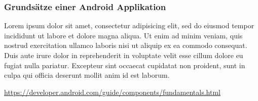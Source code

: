 \subsubsection{Grundsätze einer Android Applikation}
\label{subsec:aapp-fundam}

Lorem ipsum dolor sit amet, consectetur adipisicing elit, sed do eiusmod
tempor incididunt ut labore et dolore magna aliqua. Ut enim ad minim veniam,
quis nostrud exercitation ullamco laboris nisi ut aliquip ex ea commodo
consequat. Duis aute irure dolor in reprehenderit in voluptate velit esse
cillum dolore eu fugiat nulla pariatur. Excepteur sint occaecat cupidatat non
proident, sunt in culpa qui officia deserunt mollit anim id est laborum.

\url{https://developer.android.com/guide/components/fundamentals.html}

\clearpage %